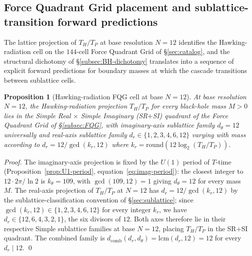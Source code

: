 \documentclass[11pt,a4paper]{article}
\newtheorem{proposition}[theorem]{Proposition}
\theoremstyle{definition}
\theoremstyle{remark}
\begin{document}
\subsection{Force Quadrant Grid placement and sublattice-transition forward predictions}\label{subsec:hawking-FQG-predictions}

The lattice projection of $T_{H}/T_{P}$ at base resolution $N = 12$ identifies the Hawking-radiation cell on the $144$-cell Force Quadrant Grid of \S\ref{sec:catalog}, and the structural dichotomy of \S\ref{subsec:BH-dichotomy} translates into a sequence of explicit forward predictions for boundary masses at which the cascade transitions between sublattice cells.

\begin{proposition}[Hawking-radiation FQG cell at base $N=12$]\label{prop:hawking-FQG-cell}
At base resolution $N = 12$, the Hawking-radiation projection $T_{H}/T_{P}$ for every black-hole mass $M > 0$ lies in the Simple Real $\times$ Simple Imaginary (SR$+$SI) quadrant of the Force Quadrant Grid of \S\ref{subsec:FQG}, with imaginary-axis sublattice family $d_{\theta} = 12$ universally and real-axis sublattice family $d_{r} \in \{1,2,3,4,6,12\}$ varying with mass according to $d_{r} = 12 / \gcd(k_{r},12)$ where $k_{r} = \mathrm{round}(12 \log_{2}(T_{H}/T_{P}))$.
\end{proposition}

\begin{proof}
The imaginary-axis projection is fixed by the $U(1)$ period of $T$-time (Proposition~\ref{prop:U1-period}, equation~\eqref{eq:imag-period}): the closest integer to $12 \cdot 2\pi/\ln 2$ is $k_{\theta} = 109$, with $\gcd(109, 12) = 1$ giving $d_{\theta} = 12$ for every mass $M$. The real-axis projection of $T_{H}/T_{P}$ at $N=12$ has $d_{r} = 12/\gcd(k_{r}, 12)$ by the sublattice-classification convention of \S\ref{sec:sublattice}; since $\gcd(k_{r}, 12) \in \{1,2,3,4,6,12\}$ for every integer $k_{r}$, we have $d_{r} \in \{12,6,4,3,2,1\}$, the six divisors of $12$. Both axes therefore lie in their respective Simple sublattice families at base $N=12$, placing $T_{H}/T_{P}$ in the SR$+$SI quadrant. The combined family is $d_{\text{comb}}(d_{r}, d_{\theta}) = \mathrm{lcm}(d_{r}, 12) = 12$ for every $d_{r} \mid 12$. \qed
\end{proof}
\end{document}

